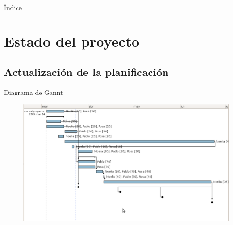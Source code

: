 \documentclass[9pt,xcolor=svgnames]{beamer}
\begin{document}
\begin{frame}{Índice} 
 \transboxin
 \tableofcontents
\end{frame}
  
  
 \section{Estado del proyecto}
 
  \subsection{Actualización de la planificación}
  
  \begin{frame}{Diagrama de Gannt}
   \transdissolve
   
   \begin{figure}[t]
    \includegraphics[scale=0.27]{./Imagenes/gannt.pdf}
   \end{figure}
   
  \end{frame}
  
\end{document}
